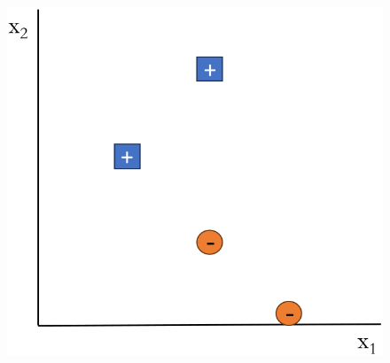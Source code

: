 \documentclass[
	number={2},
	title={Learning Linear Separators{,} SVMs and Kernels}
]{cs584notes}
\begin{document}
\begin{minipage}[m]{0.4\textwidth}
	\begin{figure}[H]
		\centering
		\includegraphics[width=\textwidth]{figures/2/perceptron_example}
		\caption{}
		\label{fig:perceptron_example}
	\end{figure}

\end{minipage}
\end{document}

